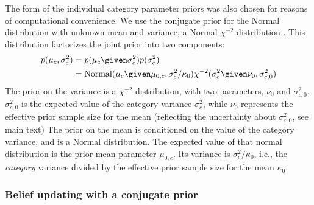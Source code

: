 The form of the individual category parameter priors was also chosen for reasons of computational convenience.  We use the conjugate prior for the Normal distribution with unknown mean and variance, a Normal-$\chi^{-2}$ distribution \cite{Gelman2003}.  This distribution factorizes the joint prior into two components:
\begin{align}
  \label{eq:7}
  p(\mu_c, \sigma^2_c) &= p(\mu_c \given \sigma^2_c) p(\sigma^2_c)\\
  &= \mathrm{Normal} (\mu_c \given \mu_{0,c}, \sigma^2_c / \kappa_0) \chi^{-2} (\sigma^2_c \given \nu_0, \sigma^2_{c,0})
\end{align}
The prior on the variance is a $\chi^{-2}$ distribution, with two parameters, $\nu_0$ and $\sigma^2_{c,0}$.  $\sigma^2_{c,0}$  is the expected value of the category variance $\sigma^2_c$, while $\nu_0$ represents the effective prior sample size for the mean (reflecting the uncertainty about $\sigma^2_{c,0}$, see main text)%
The prior on the mean is conditioned on the value of the category variance, and is a Normal distribution. The expected value of that normal distribution is the prior mean parameter $\mu_{0,c}$. Its variance is $\sigma^2_c / \kappa_0$, i.e., the \emph{category} variance divided by the effective prior sample size for the mean $\kappa_0$.

\subsubsection{Belief updating with a conjugate prior}
\label{sec:belief-updating-with}

